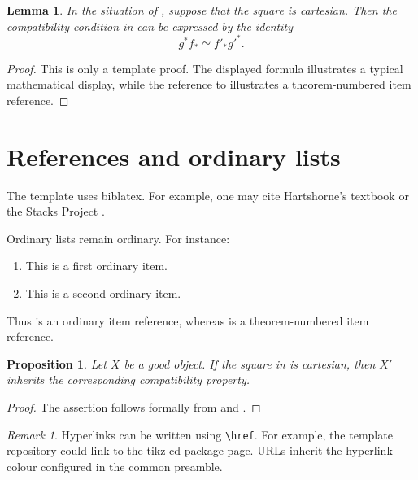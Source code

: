 \documentclass[12pt,a4paper]{amsart}
\theoremstyle{plain}
\newtheorem{lemma}[theorem]{Lemma}
\newtheorem{proposition}[theorem]{Proposition}
\theoremstyle{definition}
\theoremstyle{remark}
\newtheorem{remark}[theorem]{Remark}
\numberwithin{equation}{section}
\newif\ifshowtodos
\newcommand{\todo}[1]{%
    \ifshowtodos
        \noindent{\color{red}\usym{26A0} #1}%
    \fi
}
\begin{document}
\begin{lemma}
    \label{lemma:base-change}
    In the situation of , suppose that the square is
    cartesian. Then the compatibility condition in
     can be expressed by the identity
    \begin{equation}
        \label{equation:pull-back}
        g^* f_* \simeq f'_* {g'}^* .
    \end{equation}
\end{lemma}

\begin{proof}
    This is only a template proof. The displayed formula illustrates a typical
    mathematical display, while the reference to
     illustrates a theorem-numbered item reference.
\end{proof}

\section{References and ordinary lists}

The template uses biblatex. For example, one may cite
Hartshorne's textbook \cite{har77} or the Stacks Project \cite{stacks}.

Ordinary lists remain ordinary. For instance:
\begin{enumerate}[label=(\alph*), ref=(\alph*)]
    \item This is a first ordinary item.
        \label{item:ordinary-first} 
    \item This is a second ordinary item.
        \label{item:ordinary-second} 
\end{enumerate}
Thus  is an ordinary item reference, whereas
 is a theorem-numbered item reference.
\todo{A to-do note here.}

\begin{proposition}
    \label{proposition:main}
    Let \(X\) be a good object. If the square in  is
    cartesian, then \(X'\) inherits the corresponding compatibility property.
\end{proposition}

\begin{proof}
    The assertion follows formally from  and
    .
\end{proof}


\begin{remark}
    \label{remark:links}
    Hyperlinks can be written using \verb|\href|. For example, the template
    repository could link to
    \href{https://www.ctan.org/pkg/tikz-cd}{the tikz-cd package page}.
    URLs inherit the hyperlink colour configured in the common preamble.
\end{remark}


\printbibliography

\par
\vfill
\setlength{\parindent}{0pt}
\end{document}
